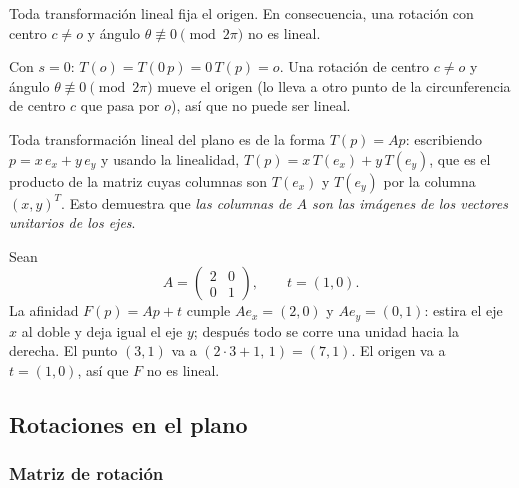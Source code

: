 \begin{proposicion}\label{prop:lineal-origen}
Toda transformación lineal fija el origen. En consecuencia, una rotación con centro
\(c\neq o\) y ángulo \(\theta\not\equiv0\pmod{2\pi}\) no es lineal.
\end{proposicion}

\begin{demostracion}
Con \(s=0\): \(T(o)=T(0\,p)=0\,T(p)=o\). Una rotación de centro \(c\neq o\) y ángulo
\(\theta\not\equiv0\pmod{2\pi}\) mueve el origen (lo lleva a otro punto de la circunferencia de centro
\(c\) que pasa por \(o\)), así que no puede ser lineal.
\end{demostracion}

Toda transformación lineal del plano es de la forma \(T(p)=Ap\): escribiendo
\(p=x\,e_x+y\,e_y\) y usando la linealidad, \(T(p)=x\,T(e_x)+y\,T(e_y)\), que es el producto
de la matriz cuyas columnas son \(T(e_x)\) y \(T(e_y)\) por la columna \((x,y)^T\). Esto
demuestra que \emph{las columnas de \(A\) son las imágenes de los vectores unitarios de los
ejes}.

\begin{ejemplo}
Sean
\[
A=\begin{pmatrix}2&0\\0&1\end{pmatrix},\qquad t=(1,0).
\]
La afinidad \(F(p)=Ap+t\) cumple \(Ae_x=(2,0)\) y \(Ae_y=(0,1)\): estira el eje \(x\) al doble y deja igual el eje
\(y\); después todo se corre una unidad hacia la derecha. El punto \((3,1)\) va a
\((2\cdot3+1,\,1)=(7,1)\). El origen va a \(t=(1,0)\), así que \(F\) no es lineal.
\end{ejemplo}

\subsection{Rotaciones en el plano}\label{sec:rot-plano}

{\small\vspace{1mm}\par}
{\small\vspace{1mm}\par}

\subsubsection{Matriz de rotación}

